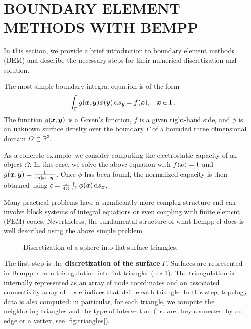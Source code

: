 \section{BOUNDARY ELEMENT METHODS WITH BEMPP}
In this section, we provide a brief introduction to boundary element methods (BEM) and describe the necessary steps for their numerical discretization and solution.

The most simple boundary integral equation is of the form
\begin{align}
  \label{eq:bnd_integral}
  \int_{\Gamma} g(\bx, \by)\phi(\by)\ds[\by] &= f(\bx),&&\bx\in\Gamma.
\end{align}
The function $g(\boldsymbol{x}, \boldsymbol{y})$ is a Green's function, $f$ is a given right-hand side, and $\phi$ is an unknown surface density over the boundary $\Gamma$ of a bounded three dimensional domain $\Omega\subset\mathbb{R}^3$.

As a concrete example, we consider computing the electrostatic capacity of an object $\Omega$. In this case, we solve the above equation with $f(\boldsymbol{x})=1$ and $g(\boldsymbol{x},\boldsymbol{y})=\frac{1}{4\uppi|\boldsymbol{x} - \boldsymbol{y}|}$. Once $\phi$ has been found, the normalized capacity is then obtained using $c = \frac{1}{4\uppi}\int_{\Gamma}\phi(\bx)\ds[\bx]$.

Many practical problems have a significantly more complex structure and can involve block systems of integral equations or even coupling with finite element (FEM) codes. Nevertheless, the fundamental structure of what Bempp-cl does is well described using the above simple problem.

\begin{figure}
  \centering
  
  \caption{Discretization of a sphere into flat surface triangles.}
  \label{fig:triangulation}
\end{figure}

\begin{figure*}
  \centering
  
  \caption{The four types of intersection of two triangles: the triangles can be (left to right) not neighbours, neighbours adjacent via a vertex, neighbours adjacent via an edge, or the same triangle. In the first case, standard quadrature is used. In the other three cases, singular quadrature rules must be used.}
  \label{fig:triangles}
\end{figure*}

The first step is the \textbf{discretization of the surface} $\Gamma$. Surfaces are represented in Bempp-cl as a triangulation into flat triangles (see \cref{fig:triangulation}). The triangulation is internally represented as an array of node coordinates and an associated connectivity array of node indices that define each triangle. In this step, topology data is also computed: in particular, for each triangle, we compute the neighboring triangles and the type of intersection (i.e. are they connected by an edge or a vertex, see \cref{fig:triangles}).

